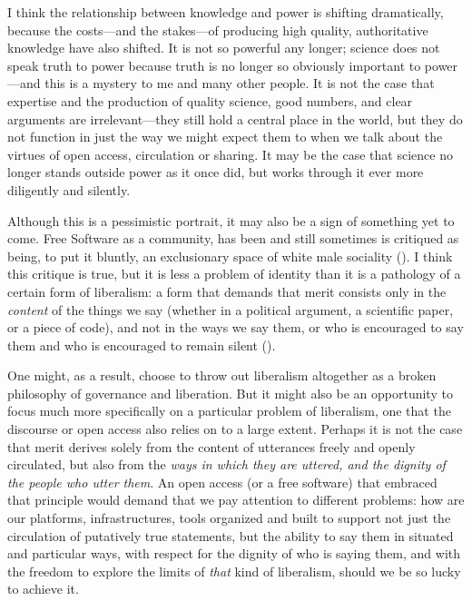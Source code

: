 \documentclass[11pt]{article}
\begin{document}
I think the relationship between knowledge and power is shifting dramatically, because the costs---and the stakes---of producing high quality, authoritative knowledge have also shifted.  It is not so powerful any longer; science does not speak truth to power because truth is no longer so obviously important to power---and this is a mystery to me and many other people.  It is not the case that expertise and the production of quality science, good numbers, and clear arguments are irrelevant---they still hold a central place in the world, but they do not function in just the way we might expect them to when we talk about the virtues of open access, circulation or sharing.  It may be the case that science no longer stands outside power as it once did, but works through it ever more diligently and silently.

Although this is a pessimistic portrait, it may also be a sign of something yet to come.  Free Software as a community, has been and still sometimes is critiqued as being, to put it bluntly, an exclusionary space of white male sociality (\cite{nafus_patches_2012,massanari2016fapp,ford2017canedit,reagle2013freeassexis}).  I think this critique is true, but it is less a problem of identity than it is a pathology of a certain form of liberalism: a form that demands that merit consists only in the \emph{content} of the things we say (whether in a political argument, a scientific paper, or a piece of code), and not in the ways we say them, or who is encouraged to say them and who is encouraged to remain silent (\cite{dunbar-hester_low_2014}).

One might, as a result, choose to throw out liberalism altogether as a broken philosophy of governance and liberation.  But it might also be an opportunity to focus much more specifically on a particular problem of liberalism, one that the discourse or open access also relies on to a large extent.  Perhaps it is not the case that merit derives solely from the content of utterances freely and openly circulated, but also from the \emph{ways in which they are uttered, and the dignity of the people who utter them}.  An open access (or a free software) that embraced that principle would demand that we pay attention to different problems:  how are our platforms, infrastructures, tools organized and built to support not just the circulation of putatively true statements, but the ability to say them in situated and particular ways, with respect for the dignity of who is saying them, and with the freedom to explore the limits of \emph{that} kind of liberalism, should we be so lucky to achieve it. 

\printbibliography
\end{document}
